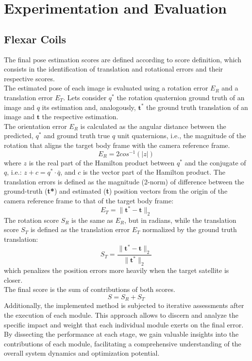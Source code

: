 \section{Experimentation and Evaluation}

\subsection{Flexar Coils}
The final pose estimation scores are defined according to \cite{KPEC} score definition, which consists in the identification of translation and rotational errors and their respective scores.\\
The estimated pose of each image is evaluated using a rotation error $E_R$ and a translation error $E_T$. Lets consider $q^*$ the rotation quaternion ground truth of an image and $q$ its estimation and, analogously, $\textbf{t}^*$ the ground truth translation of an image and $\textbf{t}$ the respective estimation.\\
The orientation error $E_R$ is calculated as the angular distance between the predicted, $q^*$ and ground truth true $q$ unit quaternions, i.e., the magnitude of the rotation that aligns the target body frame with the camera reference frame.
\begin{equation}
    E_R = 2cos^{-1}(|z|)
\end{equation}
where $z$ is the real part of the Hamilton product between $q^*$ and the conjugate of $q$, i.e.: \(z + c = q^*\cdot \bar{q}\), and $c$ is the vector part of the Hamilton product.
The translation errors is defined as the magnitude (2-norm) of difference between the ground-truth (\textbf{t*}) and estimated (\textbf{t}) position vectors from the origin of the camera reference frame to that of the target body frame:
\begin{equation}
    E_T = \|\textbf{t}^*-\textbf{t}\|_2
\end{equation}
The rotation score $S_R$ is the same as $E_R$, but in radians, while the translation score $S_T$ is defined as the translation error $E_T$ normalized by the ground truth translation:
\begin{equation}
    S_T = \frac{\|\textbf{t}^*-\textbf{t}\|_2}{\|\textbf{t}^*\|_2}
\end{equation}
which penalizes the position errors more heavily when the target satellite is closer.\\
The final score is the sum of contributions of both scores.
\begin{equation}
    S = S_R + S_T
\end{equation}
Additionally, the implemented method is subjected to iterative assessments after the execution of each module. This approach allows to discern and analyze the specific impact and weight that each individual module exerts on the final error. By dissecting the performance at each stage, we gain valuable insights into the contributions of each module, facilitating a comprehensive understanding of the overall system dynamics and optimization potential.

